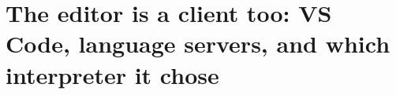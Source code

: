 \chapter{The editor is a client too: VS Code, language servers, and which interpreter it chose}
\label{ch:the-editor-is-a-client-too-vs-code}

